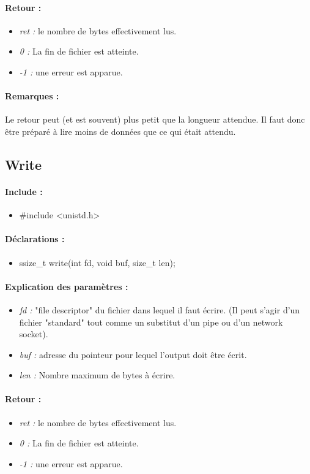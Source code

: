 \documentclass{article}[12pt]
\begin{document}
\paragraph{Retour : }
\begin{itemize}
	\item \emph{ret : } le nombre de bytes effectivement lus.
	\item \emph{0 : } La fin de fichier est atteinte.
	\item \emph{-1 : } une erreur est apparue.
\end{itemize}
\paragraph{Remarques : }
Le retour peut (et est souvent) plus petit que la longueur attendue. Il faut donc être préparé à lire moins de données que ce qui était attendu. 
\subsection{Write}
\paragraph{Include : }
\begin{itemize}
	\item \#include <unistd.h>
\end{itemize}
\paragraph{Déclarations : }
\begin{itemize}
	\item ssize\_t write(int fd, void \* buf, size\_t len);
\end{itemize}
\paragraph{Explication des paramètres : }
\begin{itemize}
	\item \emph{fd : } "file descriptor" du fichier dans lequel il faut écrire. (Il peut s'agir d'un fichier "standard" tout comme un substitut d'un pipe ou d'un network socket).
	\item \emph{buf : } adresse du pointeur pour lequel l'output doit être écrit.
	\item \emph{len : } Nombre maximum de bytes à écrire.
\end{itemize}
\paragraph{Retour : }
\begin{itemize}
	\item \emph{ret : } le nombre de bytes effectivement lus.
	\item \emph{0 : } La fin de fichier est atteinte.
	\item \emph{-1 : } une erreur est apparue.
\end{itemize}
\end{document}
